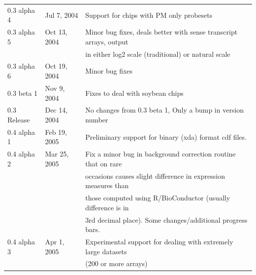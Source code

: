 \documentclass[11pt]{report}
\begin{document}
{\begin{tabular}{lll}
0.3 alpha 4&	Jul 7, 2004&	Support for chips with PM only probesets \\
0.3 alpha 5&	Oct 13, 2004&	Minor bug fixes, deals better with sense transcript arrays, output \\
&& in either log2 scale (traditional) or natural scale \\ 
0.3 alpha 6&	Oct 19, 2004&	Minor bug fixes \\
0.3 beta 1&	Nov 9, 2004&	Fixes to deal with soybean chips \\
0.3 Release&	Dec 14, 2004&	No changes from 0.3 beta 1, Only a bump in version number \\
0.4 alpha 1&	Feb 19, 2005&	Preliminary support for binary (xda) format cdf files. \\
0.4 alpha 2&	Mar 25, 2005&	Fix a minor bug in background correction routine that on rare \\
&& occasions causes slight difference in expression measures than \\ 
&& those computed using R/BioConductor (usually difference is in \\
&& 3rd decimal place). Some changes/additional progress bars. \\
0.4 alpha 3&	Apr 1, 2005&	Experimental support for dealing with extremely large datasets \\
&&  (200 or more arrays) \\ \hline
\end{tabular}
}
\clearpage
\end{document}
